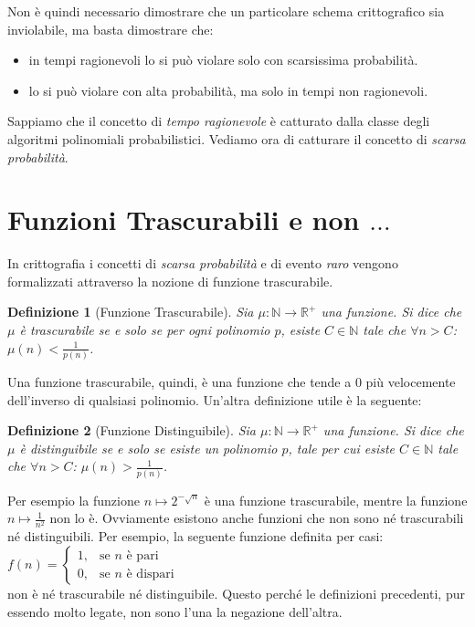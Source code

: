 \documentclass[a4paper,openright,twoside,12pt]{report}
\newtheorem{definizione}{Definizione}[chapter]
\begin{document}
Non \`e quindi necessario dimostrare che un particolare schema crittografico sia inviolabile, ma basta dimostrare che:
\begin{itemize}
 \item in tempi ragionevoli lo si pu\`o violare solo con scarsissima probabilit\`a.
 \item lo si pu\`o violare con alta probabilit\`a, ma solo in tempi non ragionevoli.
\end{itemize}
Sappiamo che il concetto di \emph{tempo ragionevole} \`e catturato dalla classe degli algoritmi polinomiali probabilistici. Vediamo ora di catturare il concetto di \emph{scarsa probabilit\`a}.
\section{Funzioni Trascurabili e non $\dots$}
In crittografia i concetti di \emph{scarsa probabilit\`a} e di evento \emph{raro} vengono formalizzati attraverso la nozione di funzione trascurabile.
\begin{definizione}[Funzione Trascurabile]
Sia $\mu: \mathbb{N} \rightarrow \mathbb{R^{+}}$ una funzione. Si dice che $\mu$ \`e trascurabile se e solo se per ogni polinomio $p$, esiste $C \in \mathbb{N} $ tale che $\forall n>C$: $\mu(n) < \frac{1}{p(n)}$.  
\end{definizione}
Una funzione trascurabile, quindi, \`e una funzione che tende a 0 pi\`u velocemente dell'inverso di qualsiasi polinomio.
Un'altra definizione utile \`e la seguente:
\begin{definizione}[Funzione Distinguibile]
Sia $\mu: \mathbb{N} \rightarrow \mathbb{R^{+}}$ una funzione. Si dice che $\mu$ \`e distinguibile se e solo se esiste un polinomio $p$, tale per cui esiste $C \in \mathbb{N} $ tale che $\forall n>C$: $\mu(n) > \frac{1}{p(n)}$.  
\end{definizione}
Per esempio la funzione $n  \mapsto 2^{-\sqrt{n}}$ \`e una funzione trascurabile, mentre la funzione $n \mapsto \frac{1}{n^2}$ non lo \`e. 
Ovviamente esistono anche funzioni che non sono n\'e trascurabili n\'e distinguibili. Per esempio, la seguente funzione definita per casi:\\
$f(n) = \begin{cases} 1, & \mbox{se } n\mbox{ \`e pari} \\ 0, & \mbox{se } n\mbox{ \`e dispari} \end{cases}$\\
non \`e n\'e trascurabile n\'e distinguibile. Questo perch\'e le definizioni precedenti, pur essendo molto legate, non sono l'una la negazione dell'altra.
\end{document}
